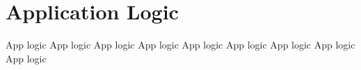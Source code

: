 \documentclass[dareport.tex]{subfiles}
\begin{document}
\section{Application Logic}
App logic
App logic
App logic
App logic
App logic
App logic
App logic
App logic
App logic
\end{document}
